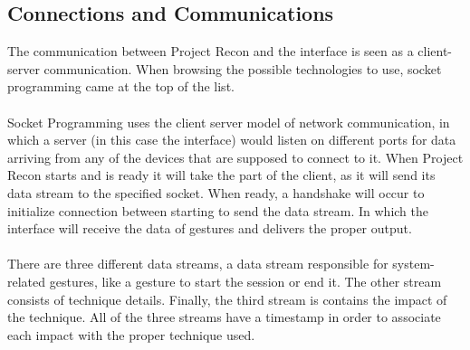 \documentclass[11pt]{article} %
\begin{document}
\subsection{Connections and Communications}
The communication between Project Recon and the interface is seen as a client-server communication. When browsing the possible technologies to use, socket programming came at the top of the list.
\\
\\
Socket Programming uses the client server model of network communication, in which a server (in this case the interface) would listen on different ports for data arriving from any of the devices that are supposed to connect to it. When Project Recon starts and is ready it will take the part of the client, as it will send its data stream to the specified socket. When ready, a handshake will occur to initialize connection between starting to send the data stream. In which the interface will receive the data of gestures and delivers the proper output.
\\
\\
There are three different data streams, a data stream responsible for system-related gestures, like a gesture to start the session or end it. The other stream consists of technique details. Finally, the third stream is contains the impact of the technique. All of the three streams have a timestamp in order to associate each impact with the proper technique used.
\end{document}
